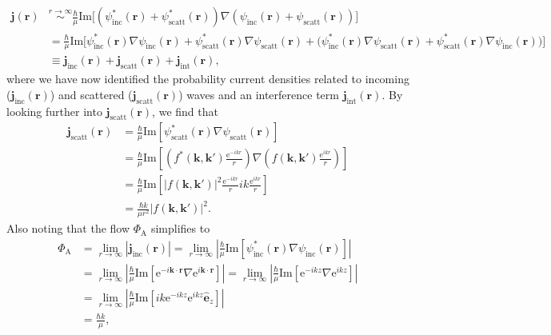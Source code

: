 \documentclass[a4paper, twoside, english, 12pt]{article}
\begin{document}
\begin{align}\label{E:probability_densities_broken_down}
	\mathbf{j}(\mathbf{r}) &\stackrel{r\rightarrow\infty}{\sim} \frac{\hbar}{\mu}\text{Im}\Big[\left(\psi_{\text{inc}}^*(\mathbf{r}) + \psi_{\text{scatt}}^*(\mathbf{r})\right)\nabla\left(\psi_{\text{inc}}(\mathbf{r}) + \psi_{\text{scatt}}(\mathbf{r})\right)\Big] \nonumber \\
	&= \frac{\hbar}{\mu}\text{Im}\Big[\psi_{\text{inc}}^*(\mathbf{r})\nabla\psi_{\text{inc}}(\mathbf{r}) + \psi_{\text{scatt}}^*(\mathbf{r})\nabla\psi_{\text{scatt}}(\mathbf{r}) + \Big( \psi_{\text{inc}}^*(\mathbf{r})\nabla\psi_{\text{scatt}}(\mathbf{r}) + \psi_{\text{scatt}}^*(\mathbf{r})\nabla\psi_{\text{inc}}(\mathbf{r}) \Big)\Big] \nonumber \\
	&\equiv \mathbf{j}_{\text{inc}}(\mathbf{r}) + \mathbf{j}_{\text{scatt}}(\mathbf{r}) + \mathbf{j}_{\text{int}}(\mathbf{r}),
\end{align}
where we have now identified the probability current densities related to incoming ($\mathbf{j}_{\text{inc}}(\mathbf{r})$) and scattered ($\mathbf{j}_{\text{scatt}}(\mathbf{r})$) waves and an interference term $\mathbf{j}_{\text{int}}(\mathbf{r})$. By looking further into $\mathbf{j}_{\text{scatt}}(\mathbf{r})$, we find that 
\begin{align}\label{E:scattered_prob_current}
	\mathbf{j}_{\text{scatt}}(\mathbf{r}) &= \frac{\hbar}{\mu}\text{Im}\left[\psi_{\text{scatt}}^*(\mathbf{r})\nabla\psi_{\text{scatt}}(\mathbf{r})\right] \nonumber \\
	&= \frac{\hbar}{\mu}\text{Im}\left[\left(f^*(\mathbf{k},\mathbf{k'})\frac{\text{e}^{-ikr}}{r}\right)\nabla\left(f(\mathbf{k},\mathbf{k'})\frac{\text{e}^{ikr}}{r}\right)\right] \nonumber \\
	&= \frac{\hbar}{\mu}\text{Im}\left[\left|f(\mathbf{k},\mathbf{k'})\right|^2\frac{\text{e}^{-ikr}}{r}ik\frac{\text{e}^{ikr}}{r}\right]  \nonumber \\
	&= \frac{\hbar k}{\mu r^2}\left|f(\mathbf{k},\mathbf{k'})\right|^2.
\end{align}
Also noting that the flow $\Phi_\text{A}$ simplifies to
\begin{align}\label{E:flow_simplification}
	\Phi_\text{A} &= \lim\limits_{r\rightarrow \infty} \left| \mathbf{j}_{\text{inc}}(\mathbf{r}) \right|= \lim\limits_{r\rightarrow \infty} \left| \frac{\hbar}{\mu}\text{Im}\left[\psi_{\text{inc}}^*(\mathbf{r})\nabla\psi_{\text{inc}}(\mathbf{r})\right] \right| \nonumber \\
	&= \lim\limits_{r\rightarrow \infty} \left| \frac{\hbar}{\mu}\text{Im}\left[\text{e}^{-i\mathbf{k}\cdot\mathbf{r}}\nabla\text{e}^{i\mathbf{k}\cdot\mathbf{r}}\right] \right| = \lim\limits_{r\rightarrow \infty} \left| \frac{\hbar}{\mu}\text{Im}\left[\text{e}^{-ikz}\nabla\text{e}^{ikz}\right] \right| \nonumber \\ 
	&= \lim\limits_{r\rightarrow \infty} \left| \frac{\hbar}{\mu}\text{Im}\left[ik\text{e}^{-ikz}\text{e}^{ikz}\hat{\mathbf{e}}_z\right] \right| \nonumber \\
	&= \frac{\hbar k}{\mu},
\end{align}
\end{document}
